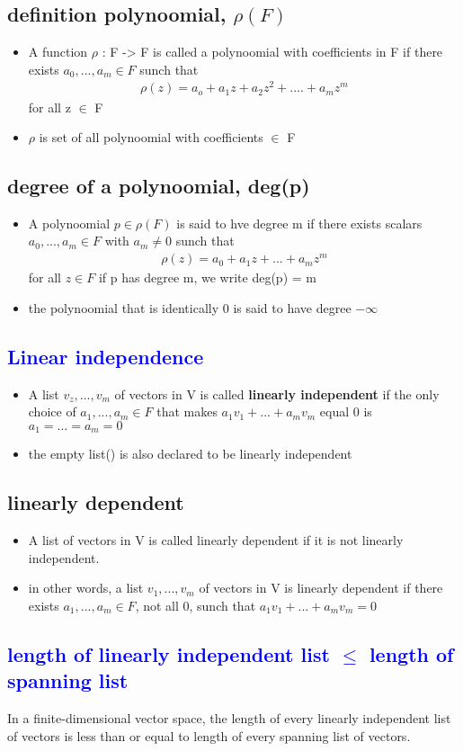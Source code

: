 \documentclass[a4paper,12pt]{article}
\begin{document}
    \subsection{definition \textbf{polynoomial,} $\rho(F)$}
    \begin{itemize}
        \item A function $\rho$ : F -> F is called a polynoomial with coefficients in F if 
        there exists $a_0,...,a_m \in F$ sunch that
        \begin{align*}
            \rho(z) = a_o + a_1z + a_2z^2 + .... +a_mz^m
        \end{align*} 
        for all z $\in$ F
        \item $\rho$ is set of all polynoomial with coefficients $\in$ F
    \end{itemize}
    \subsection{\textbf{degree of a polynoomial,} deg(p)}
    \begin{itemize}
        \item A polynoomial $p \in \rho(F)$ is said to hve degree m if 
        there exists scalars $a_0,...,a_m \in F$ with $a_m \neq 0$ sunch that
        \begin{align*}
            \rho(z) = a_0 + a_1z +...+ a_mz^m
        \end{align*}
        for all $z \in F$ if p has degree m, we write deg(p) = m
        \item the polynoomial that is identically 0 is said to have degree $-\infty$
    \end{itemize}
    \subsection{\textcolor{blue}{Linear independence}}
    \begin{itemize}
        \item A list $v_z,...,v_m$ of vectors in V is called \textbf{linearly independent} if the 
        only choice of $a_1,...,a_m \in F$ that makes $a_1v_1 + ... + a_mv_m$ equal 0 is $a_1 = ... = a_m = 0$
        \item the empty list() is also declared to be linearly independent
    \end{itemize}
    \subsection{\textbf{linearly dependent}}
    \begin{itemize}
        \item A list of vectors in V is called linearly dependent if it is not linearly independent.
        \item  in other words, a list $v_1,...,v_m$ of vectors in V is linearly dependent if there exists
        $a_1,...,a_m \in F$, not all 0, sunch that $a_1v_1 + ... + a_mv_m = 0$ 
    \end{itemize}
    \subsection{\textcolor{blue}{length of linearly independent list $\le$ length of spanning list}}
    In a finite-dimensional vector space, the length of every linearly independent list of vectors is less than
    or equal to length of every spanning list of vectors.
\end{document}
